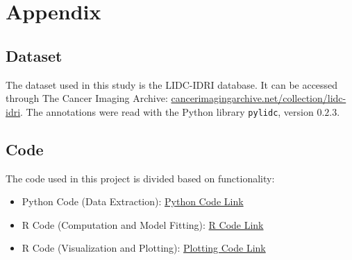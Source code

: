 \documentclass[12pt]{article}
\begin{document}
\appendix
\section{Appendix}

\subsection{Dataset}

The dataset used in this study is the LIDC-IDRI
database\cite{armato2011lidc}. It can be accessed through The Cancer Imaging
Archive:
\href{https://www.cancerimagingarchive.net/collection/lidc-idri/}
{cancerimagingarchive.net/collection/lidc-idri}. The annotations were read
with the Python library \texttt{pylidc}, version $0.2.3$.

\subsection{Code}

The code used in this project is divided based on functionality:
\begin{itemize}
  \item Python Code (Data Extraction):
    \href{https://github.com/Bubu-Droid/lung-cancer-logistic-reg-sem-3/tree/main/python}
    {Python Code Link}

  \item R Code (Computation and Model Fitting):
    \href{https://github.com/Bubu-Droid/lung-cancer-logistic-reg-sem-3/tree/main/codes/r-codes}
    {R Code Link}

  \item R Code (Visualization and Plotting):
    \href{https://github.com/Bubu-Droid/lung-cancer-logistic-reg-sem-3/tree/main/codes/plots}
    {Plotting Code Link}
\end{itemize}



\end{document}
